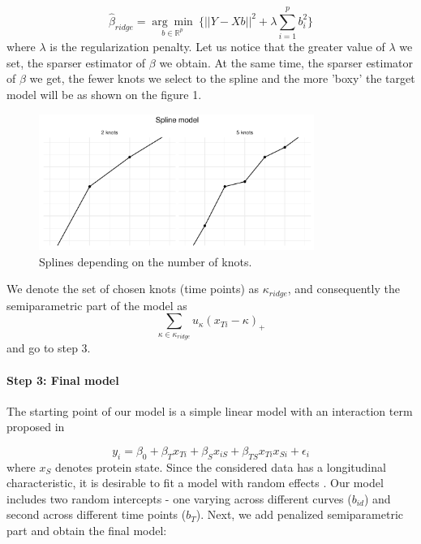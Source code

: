 \documentclass[]{MathAppl18}
\begin{document}
\begin{equation}
\label{ridge}
    \hat{\beta}_{ridge} = \underset{b \in \mathbb{R}^p}{\arg\min}~\bigg\lbrace||Y - Xb||^2 + \lambda \sum_{i = 1}^p b_i^2\bigg\rbrace
\end{equation}
where $\lambda$ is the regularization penalty. Let us notice that the greater value of $\lambda$ we set, the sparser estimator of $\beta$ we obtain. At the same time, the sparser estimator of $\beta$ we get, the fewer knots we select to the spline and the more 'boxy' the target model will be as shown on the figure 1.
 \begin{figure}[h]
    \centering
    \label{knots}
    \includegraphics[width=0.8\textwidth]{Figures/plot_spline.pdf}
    \caption{Splines depending on the number of knots.}
\end{figure}
We denote the set of chosen knots (time points) as $\kappa_{ridge}$, and consequently the semiparametric part of the model as 
$$\sum_{\kappa \in \kappa_{ridge}} u_\kappa (x_{Ti} - \kappa)_+$$
and go to step 3.

\paragraph{Step 3: Final model}

The starting point of our model is a simple linear model with an interaction term proposed in \citep{liu2011hdx}

\begin{equation}
\label{final3}
    y_i =  \beta_0 + \beta_T x_{Ti} + \beta_S x_{iS} + \beta_{TS}x_{Ti}x_{Si}+ \epsilon_i
\end{equation}
where $x_S$  denotes protein state. Since the considered data has a longitudinal characteristic, it is desirable to fit a model with random effects \citep[see][]{10.1093/ansci/1973.Symposium.10}. Our model includes two random intercepts - one varying across different curves ($b_{id}$) and second across different time points ($b_T$). Next, we add penalized semiparametric part and obtain the final model:
\end{document}
